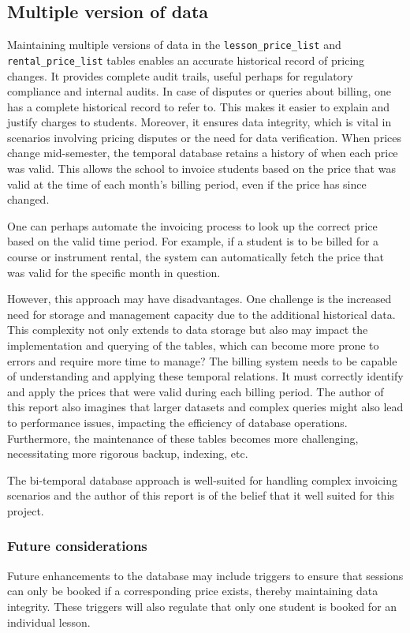 \documentclass[a4paper]{scrartcl}
\begin{document}
\subsection*{Multiple version of data}
Maintaining multiple versions of data in the
\verb|lesson_price_list| and \verb|rental_price_list|
tables enables an accurate historical record of pricing changes.
It provides complete audit trails, useful perhaps for regulatory compliance and internal audits.
In case of disputes or queries about billing, one has a complete historical record to refer to.
This makes it easier to explain and justify charges to students.
Moreover, it ensures data integrity,
which is vital in scenarios involving pricing disputes or the need for data verification.
When prices change mid-semester, the temporal database retains a history of when each price was valid.
This allows the school to invoice students based on the price that was valid at the time of each month's billing period,
even if the price has since changed.

One can perhaps automate the invoicing process to look up the correct price based on the valid time period.
For example, if a student is to be billed for a course or instrument rental, the system can automatically fetch the
price that was valid for the specific month in question.

However, this approach may have disadvantages.
One challenge is the increased need for storage and management capacity due to the additional historical data.
This complexity not only extends to data storage but also may impact the implementation and querying of the tables,
which can become more prone to errors and require more time to manage?
The billing system needs to be capable of understanding and applying these temporal relations.
It must correctly identify and apply the prices that were valid during each billing period.
The author of this report also imagines that larger datasets and complex queries might also lead to performance issues,
impacting the efficiency of database operations.
Furthermore, the maintenance of these tables becomes more challenging,
necessitating more rigorous backup, indexing, etc.

The bi-temporal database approach is well-suited for handling complex invoicing scenarios and the
author of this report is of the belief that it well suited for this project.

\subsubsection*{Future considerations}
Future enhancements to the database may include triggers to ensure that sessions can only be booked if a corresponding price exists,
thereby maintaining data integrity.
These triggers will also regulate that only one student is booked for an individual lesson.
\end{document}
